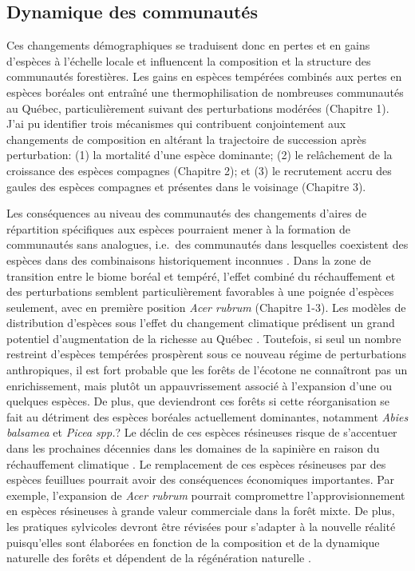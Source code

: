 \hypertarget{dynamique-des-communautuxe9s}{%
\subsection{Dynamique des
communautés}\label{dynamique-des-communautuxe9s}}

Ces changements démographiques se traduisent donc en pertes et en gains
d'espèces à l'échelle locale et influencent la composition et la
structure des communautés forestières. Les gains en espèces tempérées
combinés aux pertes en espèces boréales ont entraîné une
thermophilisation de nombreuses communautés au Québec, particulièrement
suivant des perturbations modérées (Chapitre 1). J'ai pu identifier
trois mécanismes qui contribuent conjointement aux changements de
composition en altérant la trajectoire de succession après perturbation:
(1) la mortalité d'une espèce dominante; (2) le relâchement de la
croissance des espèces compagnes (Chapitre 2); et (3) le recrutement
accru des gaules des espèces compagnes et présentes dans le voisinage
(Chapitre 3).

Les conséquences au niveau des communautés des changements d'aires de
répartition spécifiques aux espèces pourraient mener à la formation de
communautés sans analogues, i.e.~des communautés dans lesquelles
coexistent des espèces dans des combinaisons historiquement inconnues
\citep{williams_novel_2007}. Dans la zone de transition entre le biome
boréal et tempéré, l'effet combiné du réchauffement et des perturbations
semblent particulièrement favorables à une poignée d'espèces seulement,
avec en première position \emph{Acer rubrum} (Chapitre 1-3). Les modèles
de distribution d'espèces sous l'effet du changement climatique
prédisent un grand potentiel d'augmentation de la richesse au Québec
\citep{berteaux_changements_2014}. Toutefois, si seul un nombre
restreint d'espèces tempérées prospèrent sous ce nouveau régime de
perturbations anthropiques, il est fort probable que les forêts de
l'écotone ne connaîtront pas un enrichissement, mais plutôt un
appauvrissement associé à l'expansion d'une ou quelques espèces. De
plus, que deviendront ces forêts si cette réorganisation se fait au
détriment des espèces boréales actuellement dominantes, notamment
\emph{Abies balsamea} et \emph{Picea spp.}? Le déclin de ces espèces
résineuses risque de s'accentuer dans les prochaines décennies dans les
domaines de la sapinière en raison du réchauffement climatique
\citep{dorangeville_beneficial_2018}. Le remplacement de ces espèces
résineuses par des espèces feuillues pourrait avoir des conséquences
économiques importantes. Par exemple, l'expansion de \emph{Acer rubrum}
pourrait compromettre l'approvisionnement en espèces résineuses à grande
valeur commerciale dans la forêt mixte. De plus, les pratiques
sylvicoles devront être révisées pour s'adapter à la nouvelle réalité
puisqu'elles sont élaborées en fonction de la composition et de la
dynamique naturelle des forêts et dépendent de la régénération naturelle
\citep{pinna_amenagement_2009}.

